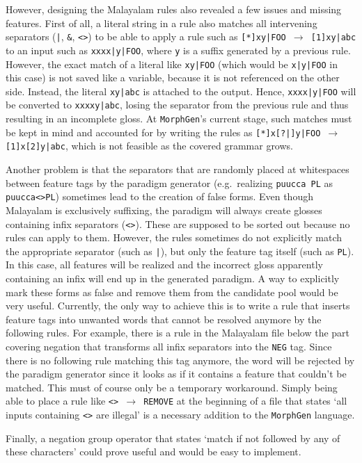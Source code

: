 \documentclass[a4paper]{article}
\newcommand{\arr}{$\rightarrow$ }
\newcommand{\typ}[1]{\texttt{#1}}
\begin{document}
However, designing the Malayalam rules also revealed a few issues and missing features. First of all, a literal string in a rule also matches all intervening separators (\typ{|}, \typ{\&}, \typ{<>}) to be able to apply a rule such as \typ{[*]xy|FOO \arr [1]xy|abc} to an input such as \typ{xxxx|y|FOO}, where \typ{y} is a suffix generated by a previous rule. However, the exact match of a literal like \typ{xy|FOO} (which would be \typ{x|y|FOO} in this case) is not saved like a variable, because it is not referenced on the other side. Instead, the literal \typ{xy|abc} is attached to the output. Hence, \typ{xxxx|y|FOO} will be converted to \typ{xxxxy|abc}, losing the separator from the previous rule and thus resulting in an incomplete gloss. At \typ{MorphGen}'s current stage, such matches must be kept in mind and accounted for by writing the rules as \typ{[*]x[?|]y|FOO \arr [1]x[2]y|abc}, which is not feasible as the covered grammar grows.

Another problem is that the separators that are randomly placed at whitespaces between feature tags by the paradigm generator (e.g.\ realizing \typ{puucca PL} as \typ{puucca<>PL}) sometimes lead to the creation of false forms. Even though Malayalam is exclusively suffixing, the paradigm will always create glosses containing infix separators (\typ{<>}). These are supposed to be sorted out because no rules can apply to them. However, the rules sometimes do not explicitly match the appropriate separator (such as \typ{|}), but only the feature tag itself (such as \typ{PL}). In this case, all features will be realized and the incorrect gloss apparently containing an infix will end up in the generated paradigm. A way to explicitly mark these forms as false and remove them from the candidate pool would be very useful. Currently, the only way to achieve this is to write a rule that inserts feature tags into unwanted words that cannot be resolved anymore by the following rules. For example, there is a rule in the Malayalam file below the part covering negation that transforms all infix separators into the \typ{NEG} tag. Since there is no following rule matching this tag anymore, the word will be rejected by the paradigm generator since it looks as if it contains a feature that couldn't be matched. This must of course only be a temporary workaround. Simply being able to place a rule like \typ{<> \arr REMOVE} at the beginning of a file that states `all inputs containing \typ{<>} are illegal' is a necessary addition to the \typ{MorphGen} language.

Finally, a negation group operator that states `match if not followed by any of these characters' could prove useful and would be easy to implement.
\end{document}
